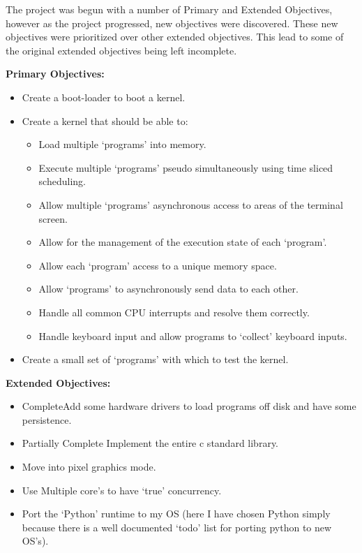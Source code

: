 \documentclass[a4paper]{report}
\begin{document}
The project was begun with a number of Primary and Extended Objectives, however as the project progressed, new objectives were discovered. These new objectives were prioritized over other extended objectives. This lead to some of the original extended objectives being left incomplete.

\textbf {Primary Objectives:}

\begin{itemize}
\item Create a boot-loader to boot a kernel.
\item Create a kernel that should be able to:
\begin{itemize}
\item Load multiple `programs' into memory.
\item Execute multiple `programs' pseudo simultaneously using time sliced scheduling.
\item Allow multiple `programs' asynchronous access to areas of the terminal screen.
\item Allow for the management of the execution state of each `program'.
\item Allow each `program' access to a unique memory space.
\item Allow `programs' to asynchronously send data to each other.
\item Handle all common CPU interrupts and resolve them correctly.
\item Handle keyboard input and allow programs to `collect' keyboard inputs.
\end{itemize}
\item Create a small set of `programs' with which to test the kernel.
\end{itemize}

\textbf {Extended Objectives:}


\begin{itemize}
\item \lbrack Complete\rbrack Add some hardware drivers to load programs off disk and have some persistence.
\item \lbrack Partially Complete \rbrack Implement the entire c standard library.
\item Move into pixel graphics mode.
\item Use Multiple core's to have `true' concurrency.
\item Port the `Python' runtime to my OS (here I have chosen Python simply because there is a well documented `todo' list for porting python to new OS's).
\end{itemize}
\end{document}
